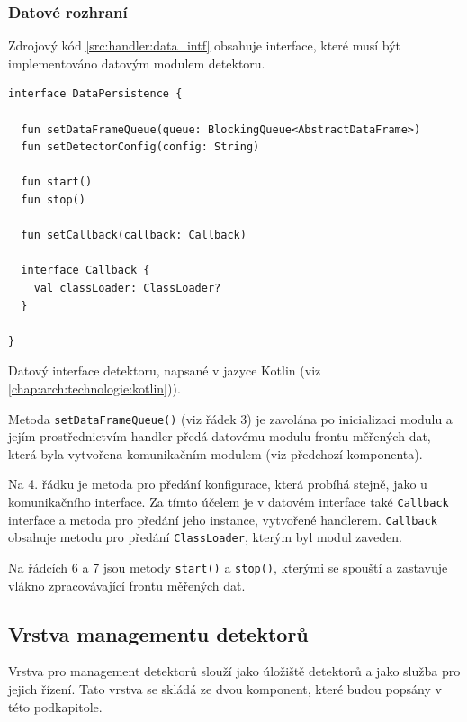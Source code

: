 \subsubsection{Datové rozhraní}\label{chap:handler:detector_layer:dataIntf}
Zdrojový kód \ref{src:handler:data_intf} obsahuje interface, které musí být implementováno datovým modulem detektoru.

\begin{code}[h!]
\begin{verbatim}
interface DataPersistence {

  fun setDataFrameQueue(queue: BlockingQueue<AbstractDataFrame>)
  fun setDetectorConfig(config: String)

  fun start()
  fun stop()

  fun setCallback(callback: Callback)

  interface Callback {
    val classLoader: ClassLoader?
  }

}
\end{verbatim}
\caption{Datový interface detektoru, napsané v jazyce Kotlin (viz \ref{chap:arch:technologie:kotlin})).}
\label{src:handler:data_intf}
\end{code}

Metoda \texttt{setDataFrameQueue()} (viz řádek 3) je zavolána po inicializaci modulu a jejím prostřednictvím handler předá datovému modulu frontu měřených dat, která byla vytvořena komunikačním modulem (viz předchozí komponenta).

Na 4. řádku je metoda pro předání konfigurace, která probíhá stejně, jako u komunikačního interface. Za tímto účelem je v datovém interface také \texttt{Callback} interface a metoda pro předání jeho instance, vytvořené handlerem. \texttt{Callback} obsahuje metodu pro předání \texttt{ClassLoader}, kterým byl modul zaveden.

Na řádcích 6 a 7 jsou metody \texttt{start()} a \texttt{stop()}, kterými se spouští a zastavuje vlákno zpracovávající frontu měřených dat.

\subsection{Vrstva managementu detektorů}\label{chap:handler:detectors_layer}
Vrstva pro management detektorů slouží jako úložiště detektorů a jako služba pro jejich řízení. Tato vrstva se skládá ze dvou komponent, které budou popsány v této podkapitole.


